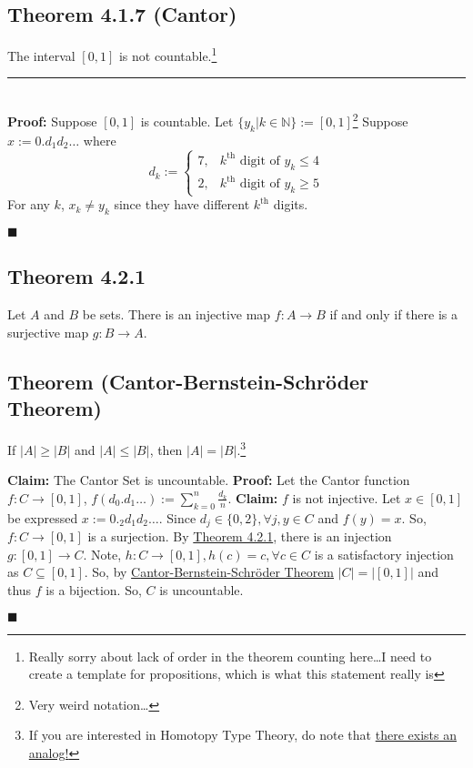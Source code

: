 \documentclass[11pt]{book}
\newcommand{\N}{\mathbb{N}}
\newcommand{\horline}{\noindent\rule{14.25cm}{0.6pt}\\}
\newcounter{theorem}
\newcommand{\QED}{\begin{flushright}$\blacksquare$\end{flushright}}
\begin{document}
	\subsection{Theorem 4.1.7 (Cantor)}
	\label{subsec:theor417}
		\begin{theor}
			The interval $[0,1]$ is not countable.\footnote{Really sorry about lack of order in the theorem counting here\dots I need to create a template for propositions, which is what this statement really is}\hfill\break
			\horline
			\textbf{Proof:} Suppose $[0,1]$ is countable. Let $\{y_k | k \in \N\} := [0,1]$\footnote{Very weird notation\dots} Suppose $x := 0.d_1d_2\dots$ where
			$$d_k := \begin{cases} 7 ,& k^{\text{th}} \text{ digit of } y_k \leq 4\\ 2 ,& k^{\text{th}} \text{ digit of } y_k \geq 5 \end{cases}$$
				For any $k$, $x_k \neq y_k$ since they have different $k^{\text{th}}$ digits. \QED
		\end{theor}
	\subsection{Theorem 4.2.1}
	\label{subsec:theor421}
		\begin{theor}
			Let $A$ and $B$ be sets. There is an injective map $f:A \to B$ if and only if there is a surjective map $g: B \to A$. 
		\end{theor}
	\subsection{Theorem (Cantor-Bernstein-Schr{\"o}der Theorem)}
	\label{subsec:CBST}
		\begin{theor}
			If $|A| \geq |B|$ and $|A| \leq |B|$, then $|A| = |B|$.\footnote{If you are interested in Homotopy Type Theory, do note that \href{https://homotopytypetheory.org/2020/01/26/the-cantor-schroder-bernstein-theorem-for-\%e2\%88\%9e-groupoids/}{there exists an analog!}}
		\end{theor}
		\begin{examp}
			\textbf{Claim:} The Cantor Set is uncountable.
			\textbf{Proof:} Let the Cantor function $f: C \to [0,1]$, $f(d_0.d_1\dots) := \displaystyle\sum_{k = 0}^n{\frac{d_k}{n}}$.\hfill\break
			\textbf{Claim:} $f$ is not injective. Let $x \in [0,1]$ be expressed $x:= 0._2d_1d_2\dots$. Since $d_j \in \{0,2\}, \forall j, y \in C$ and $f(y) = x$.
			So, $f:C \to [0,1]$ is a surjection. By \hyperref[subsec:theor421]{Theorem 4.2.1}, there is an injection  $g:[0,1] \to C$.\hfill\break
			Note, $h: C \to [0,1], h(c) = c, \forall c \in C$ is a satisfactory injection as $C \subseteq [0,1]$. So, by \hyperref[subsec:CBST]{Cantor-Bernstein-Schr{\"o}der Theorem}
			$|C| = |[0,1]|$ and thus $f$ is a bijection. So, $C$ is uncountable. \QED
		\end{examp}
\end{document}
